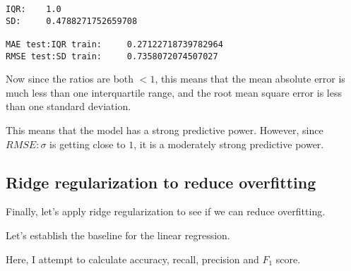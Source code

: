     \begin{Verbatim}[commandchars=\\\{\}]
IQR:    1.0
SD:     0.4788271752659708

MAE test:IQR train:     0.27122718739782964
RMSE test:SD train:     0.7358072074507027
    \end{Verbatim}

    Now since the ratios are both \(< 1\), this means that the mean absolute
error is much less than one interquartile range, and the root mean
square error is less than one standard deviation.

This means that the model has a strong predictive power. However, since
\(R\!M\!S\!E:\sigma\) is getting close to \(1\), it is a moderately
strong predictive power.

    \hypertarget{ridge-regularization-to-reduce-overfitting}{%
\subsection{Ridge regularization to reduce
overfitting}\label{ridge-regularization-to-reduce-overfitting}}

Finally, let's apply ridge regularization to see if we can reduce
overfitting.

Let's establish the baseline for the linear regression.

    Here, I attempt to calculate accuracy, recall, precision and \(F_1\)
score.

